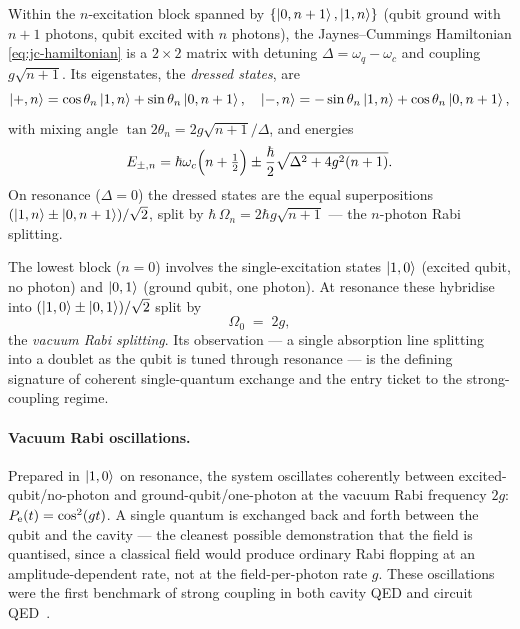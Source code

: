 \begin{statement}
\label{stmt:dressed-states}
Within the $n$-excitation block spanned by
$\{\ket{0,n+1},\ket{1,n}\}$ (qubit ground with $n{+}1$ photons,
qubit excited with $n$ photons), the Jaynes--Cummings Hamiltonian
\cref{eq:jc-hamiltonian} is a $2\times2$ matrix with detuning
$\Delta=\omega_q-\omega_c$ and coupling $g\sqrt{n+1}$. Its
eigenstates, the \emph{dressed states}, are
\begin{equation}
\label{eq:dressed-states}
\ket{+,n}=\cos\theta_n\ket{1,n}+\sin\theta_n\ket{0,n+1},\quad
\ket{-,n}=-\sin\theta_n\ket{1,n}+\cos\theta_n\ket{0,n+1},
\end{equation}
with mixing angle $\tan2\theta_n=2g\sqrt{n+1}/\Delta$, and energies
\begin{equation}
\label{eq:dressed-energies}
E_{\pm,n}=\hbar\omega_c\Bigl(n+\tfrac12\Bigr)
\pm\frac{\hbar}{2}\sqrt{\Delta^2+4g^2(n+1)}.
\end{equation}
On resonance ($\Delta=0$) the dressed states are the equal
superpositions $(\ket{1,n}\pm\ket{0,n+1})/\sqrt2$, split by
$\hbar\,\Omega_n=2\hbar g\sqrt{n+1}$ --- the $n$-photon Rabi
splitting.
\end{statement}

\begin{statement}
\label{stmt:vacuum-rabi}
The lowest block ($n=0$) involves the single-excitation states
$\ket{1,0}$ (excited qubit, no photon) and $\ket{0,1}$ (ground
qubit, one photon). At resonance these hybridise into
$(\ket{1,0}\pm\ket{0,1})/\sqrt2$ split by
\begin{equation}
\label{eq:vacuum-rabi}
\Omega_0 \;=\; 2g,
\end{equation}
the \emph{vacuum Rabi splitting}. Its observation --- a single
absorption line splitting into a doublet as the qubit is tuned
through resonance --- is the defining signature of coherent
single-quantum exchange and the entry ticket to the strong-coupling
regime.
\end{statement}

\paragraph{Vacuum Rabi oscillations.}
Prepared in $\ket{1,0}$ on resonance, the system oscillates
coherently between excited-qubit/no-photon and ground-qubit/one-photon
at the vacuum Rabi frequency $2g$:
$P_{\rm e}(t)=\cos^2(gt)$. A single quantum is exchanged back and
forth between the qubit and the cavity --- the cleanest possible
demonstration that the field is quantised, since a classical field
would produce ordinary Rabi flopping at an amplitude-dependent rate,
not at the field-per-photon rate $g$. These oscillations were the
first benchmark of strong coupling in both cavity QED and circuit
QED~\cite{haroche2006,blais2021}.

